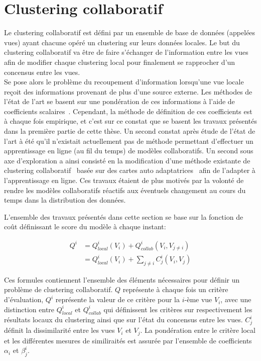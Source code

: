 \section{Clustering collaboratif}


Le clustering collaboratif est défini par un ensemble de base de données (appelées vues) ayant chacune opéré un clustering sur leurs données locales. Le but du clustering collaboratif va \^{e}tre de faire s'échanger de l'information entre les vues afin de modifier chaque clustering local pour finalement se rapprocher d'un concensus entre les vues.\\

Se pose alors le problème du recoupement d'information lorsqu'une vue locale reçoit des informations provenant de plus d'une source externe. Les méthodes de l'état de l'art se basent sur une pondération de ces informations à l'aide de coefficients scalaires~\cite{cornuejols2018collaborative,pedrycz2002collaborative,maurel2017incremental,ghassany2012collaborative,sublime2016collaborative,rastin2015collaborative}. Cependant, la méthode de définition de ces coefficients est à chaque fois empirique, et c'est sur ce constat que se basent les travaux présentés dans la première partie de cette thèse. Un second constat après étude de l'état de l'art à été qu'il n'existait actuellement pas de méthode permettant d'effectuer un apprentissage en ligne (au fil du temps) de modèles collaboratifs. Un second sous axe d'exploration a ainsi consisté en la modification d'une méthode existante de clustering collaboratif~\cite{ghassany2012collaborative} basée sur des cartes auto adaptatrices~\cite{KOHO1} afin de l'adapter à l'apprentissage en ligne. Ces travaux étaient de plus motivés par la volonté de rendre les modèles collaboratifs réactifs aux éventuels changement au cours du temps dans la distribution des données.

L'ensemble des travaux présentés dans cette section se base sur la fonction de co\^{u}t définissant le score du modèle à chaque instant:

\begin{align}
    \label{eq:sum_globalC}
    Q^i &= Q^i_{local}(V_i) + Q^i_{collab}(V_i, V_{j\neq i})\\
    &= Q^i_{local}(V_i) + \sum_{j\neq i} C_j^i(V_i, V_j)
\end{align}

Ces formules contiennent l'ensemble des éléments nécessaires pour définir un problème de clustering collaboratif. $Q$ représente à chaque fois un critère d'évaluation, $Q^i$ représente la valeur de ce critère pour la $i$-ème vue $V_i$, avec une distinction entre $Q^i_{local}$ et $Q^i_{collab}$ qui définissent les critères sur respectivement les résultats locaux du clustering ainsi que sur l'état du concensus entre les vues. $C_j^i$ définit la dissimilarité entre les vues $V_i$ et $V_j$. La pondération entre le critère local et les différentes mesures de similiraités est assurée par l'ensemble de coefficients $\alpha_i$ et $\beta_j^i$.

